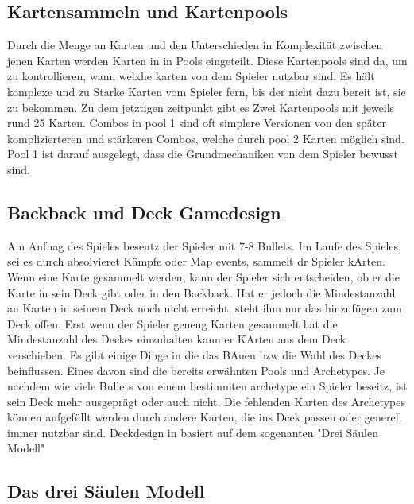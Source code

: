 \subsection{Kartensammeln und Kartenpools}\label{subsec:placementMatters}

Durch die Menge an Karten und den Unterschieden in Komplexität zwischen jenen Karten werden Karten in \FF in Pools eingeteilt.
Diese Kartenpools sind da, um zu kontrollieren, wann welxhe karten von dem Spieler nutzbar sind.
Es hält komplexe und zu Starke Karten vom Spieler fern, bis der nicht dazu bereit ist, sie zu bekommen.
Zu dem jetztigen zeitpunkt gibt es Zwei Kartenpools mit jeweils rund 25 Karten. Combos in pool 1 sind oft simplere
Versionen von den später komplizierteren und stärkeren Combos, welche durch pool 2 Karten möglich sind.
Pool 1 ist darauf ausgelegt, dass die Grundmechaniken von \FF dem Spieler bewusst sind.


\subsection{Backback und Deck Gamedesign}\label{subsec:placementMatters}

Am Anfnag des Spieles beseutz der Spieler mit 7-8 Bullets. Im Laufe des Spieles, sei es durch absolvieret Kämpfe
oder Map events, sammelt dr Spieler kArten. Wenn eine Karte gesammelt werden, kann der Spieler sich entscheiden,
ob er die Karte in sein Deck gibt oder in den Backback. Hat er jedoch die Mindestanzahl an Karten in seinem Deck
noch nicht erreicht, steht ihm nur das hinzufügen zum Deck offen. Erst wenn der Spieler geneug Karten gesammelt hat
die Mindestanzahl des Deckes einzuhalten kann er KArten aus dem Deck verschieben. Es gibt einige Dinge
in \FF die das BAuen bzw die Wahl des Deckes beinflussen. Eines davon sind die bereits erwähnten Pools und Archetypes.
Je nachdem wie viele Bullets von einem bestimmten archetype ein Spieler beseitz, ist sein Deck mehr ausgeprägt oder auch nicht.
Die fehlenden Karten des Archetypes können aufgefüllt werden durch andere Karten, die ins Dcek passen oder generell immer nutzbar sind.
Deckdesign in \FF basiert auf dem sogenanten "Drei Säulen Modell"


\subsection{Das drei Säulen Modell}\label{subsec:placementMatters}

